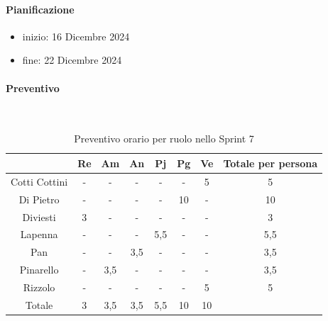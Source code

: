 \documentclass{article}
\begin{document}
                \paragraph{Pianificazione}
                \begin{itemize}
                    \item inizio: 16 Dicembre 2024
                    \item fine: 22 Dicembre 2024
                \end{itemize}

                \paragraph{Preventivo}\mbox{}\\
                \begin{table}[H]
                    \centering
                    \begin{tabular}{|c|c|c|c|c|c|c|c|}
                    \hline
                                  & Re  & Am  & An  & Pj  & Pg  & Ve  & Totale per persona \\ \hline
                    Cotti Cottini & -   & -   & -   & -   & -   & 5   & 5                  \\ \hline
                    Di Pietro     & -   & -   & -   & -   & 10  & -   & 10                 \\ \hline
                    Diviesti      & 3   & -   & -   & -   & -   & -   & 3                  \\ \hline
                    Lapenna       & -   & -   & -   & 5,5 & -   & -   & 5,5                \\ \hline
                    Pan           & -   & -   & 3,5 & -   & -   & -   & 3,5                \\ \hline
                    Pinarello     & -   & 3,5 & -   & -   & -   & -   & 3,5                \\ \hline
                    Rizzolo       & -   & -   & -   & -   & -   & 5   & 5                  \\ \hline
                    Totale        & 3   & 3,5 & 3,5 & 5,5 & 10  & 10  &                    \\ \hline
                    \end{tabular}
                    \caption{Preventivo orario per ruolo nello Sprint 7}
                \end{table}
\end{document}
